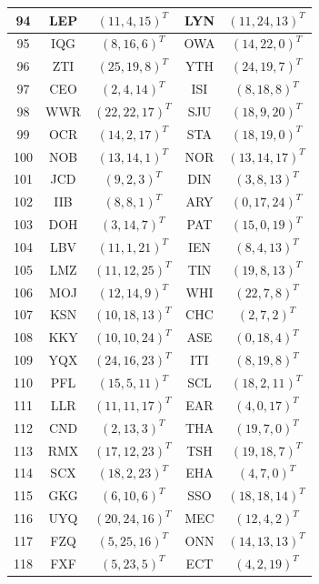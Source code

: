 \begin{longtable}{|c|c|c|c|c|}
  \hline
  94 & LEP & $(11, 4, 15)^T$ & LYN & $(11, 24, 13)^T$ \\
  \hline
  95 & IQG & $(8, 16, 6)^T$ & OWA & $(14, 22, 0)^T$ \\
  \hline
  96 & ZTI & $(25, 19, 8)^T$ & YTH & $(24, 19, 7)^T$ \\
  \hline
  97 & CEO & $(2, 4, 14)^T$ & ISI & $(8, 18, 8)^T$ \\
  \hline
  98 & WWR & $(22, 22, 17)^T$ & SJU & $(18, 9, 20)^T$ \\
  \hline
  99 & OCR & $(14, 2, 17)^T$ & STA & $(18, 19, 0)^T$ \\
  \hline
  100 & NOB & $(13, 14, 1)^T$ & NOR & $(13, 14, 17)^T$ \\
  \hline
  101 & JCD & $(9, 2, 3)^T$ & DIN & $(3, 8, 13)^T$ \\
  \hline
  102 & IIB & $(8, 8, 1)^T$ & ARY & $(0, 17, 24)^T$ \\
  \hline
  103 & DOH & $(3, 14, 7)^T$ & PAT & $(15, 0, 19)^T$ \\
  \hline
  104 & LBV & $(11, 1, 21)^T$ & IEN & $(8, 4, 13)^T$ \\
  \hline
  105 & LMZ & $(11, 12, 25)^T$ & TIN & $(19, 8, 13)^T$ \\
  \hline
  106 & MOJ & $(12, 14, 9)^T$ & WHI & $(22, 7, 8)^T$ \\
  \hline
  107 & KSN & $(10, 18, 13)^T$ & CHC & $(2, 7, 2)^T$ \\
  \hline
  108 & KKY & $(10, 10, 24)^T$ & ASE & $(0, 18, 4)^T$ \\
  \hline
  109 & YQX & $(24, 16, 23)^T$ & ITI & $(8, 19, 8)^T$ \\
  \hline
  110 & PFL & $(15, 5, 11)^T$ & SCL & $(18, 2, 11)^T$ \\
  \hline
  111 & LLR & $(11, 11, 17)^T$ & EAR & $(4, 0, 17)^T$ \\
  \hline
  112 & CND & $(2, 13, 3)^T$ & THA & $(19, 7, 0)^T$ \\
  \hline
  113 & RMX & $(17, 12, 23)^T$ & TSH & $(19, 18, 7)^T$ \\
  \hline
  114 & SCX & $(18, 2, 23)^T$ & EHA & $(4, 7, 0)^T$ \\
  \hline
  115 & GKG & $(6, 10, 6)^T$ & SSO & $(18, 18, 14)^T$ \\
  \hline
  116 & UYQ & $(20, 24, 16)^T$ & MEC & $(12, 4, 2)^T$ \\
  \hline
  117 & FZQ & $(5, 25, 16)^T$ & ONN & $(14, 13, 13)^T$ \\
  \hline
  118 & FXF & $(5, 23, 5)^T$ & ECT & $(4, 2, 19)^T$ \\

\end{longtable}
